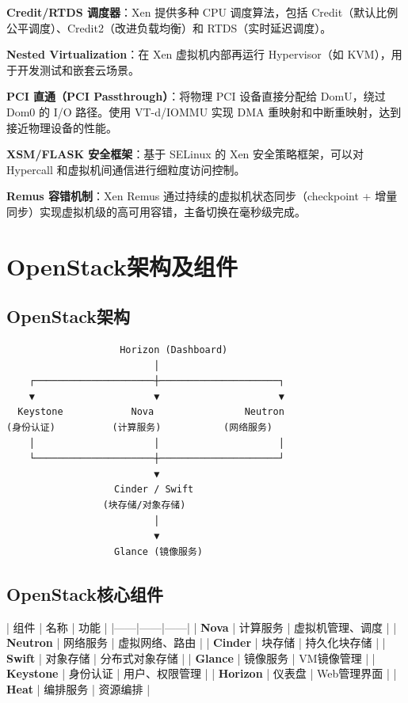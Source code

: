 \documentclass[12pt,UTF8]{ctexbook}
\begin{document}
\textbf{Credit/RTDS 调度器}：Xen 提供多种 CPU 调度算法，包括 Credit（默认比例公平调度）、Credit2（改进负载均衡）和 RTDS（实时延迟调度）。

\textbf{Nested Virtualization}：在 Xen 虚拟机内部再运行 Hypervisor（如 KVM），用于开发测试和嵌套云场景。

\textbf{PCI 直通（PCI Passthrough）}：将物理 PCI 设备直接分配给 DomU，绕过 Dom0 的 I/O 路径。使用 VT-d/IOMMU 实现 DMA 重映射和中断重映射，达到接近物理设备的性能。

\textbf{XSM/FLASK 安全框架}：基于 SELinux 的 Xen 安全策略框架，可以对 Hypercall 和虚拟机间通信进行细粒度访问控制。

\textbf{Remus 容错机制}：Xen Remus 通过持续的虚拟机状态同步（checkpoint + 增量同步）实现虚拟机级的高可用容错，主备切换在毫秒级完成。

\section{OpenStack架构及组件}
\label{sec:openstack}

\subsection*{OpenStack架构}

\begin{lstlisting}
                    Horizon (Dashboard)
                          │
    ┌─────────────────────┼─────────────────────┐
    ▼                     ▼                     ▼
  Keystone            Nova                Neutron
(身份认证)          (计算服务)           (网络服务)
    │                     │                     │
    └─────────────────────┼─────────────────────┘
                          ▼
                   Cinder / Swift
                 (块存储/对象存储)
                          │
                          ▼
                   Glance (镜像服务)
\end{lstlisting}

\subsection*{OpenStack核心组件}

| 组件 | 名称 | 功能 |
|------|------|------|
| \textbf{Nova} | 计算服务 | 虚拟机管理、调度 |
| \textbf{Neutron} | 网络服务 | 虚拟网络、路由 |
| \textbf{Cinder} | 块存储 | 持久化块存储 |
| \textbf{Swift} | 对象存储 | 分布式对象存储 |
| \textbf{Glance} | 镜像服务 | VM镜像管理 |
| \textbf{Keystone} | 身份认证 | 用户、权限管理 |
| \textbf{Horizon} | 仪表盘 | Web管理界面 |
| \textbf{Heat} | 编排服务 | 资源编排 |
\end{document}
